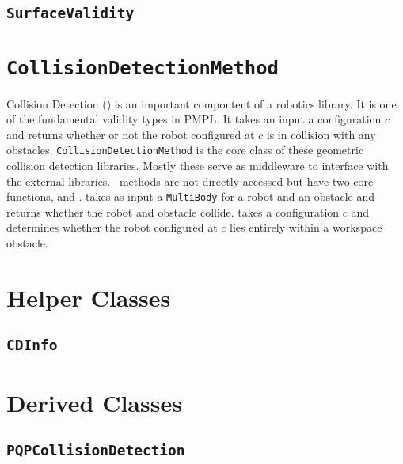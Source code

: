 \subsection{\texttt{SurfaceValidity}}

\section{\texttt{CollisionDetectionMethod}}

Collision Detection (\cd) is an important compontent of a robotics library. It
is one of the fundamental validity types in PMPL. It takes an input a
configuration $c$ and returns whether or not the robot configured at $c$ is in
collision with any obstacles. \texttt{CollisionDetectionMethod} is the core
class of these geometric collision detection libraries. Mostly these serve as
middleware to interface with the external libraries. \cd\ methods are not
directly accessed but have two core functions,  and
.  takes as input a
\texttt{MultiBody} for a robot and an obstacle and returns whether the robot and
obstacle collide.  takes a configuration $c$ and
determines whether the robot configured at $c$ lies entirely within a workspace
obstacle.

\section{Helper Classes}

\subsection{\texttt{CDInfo}}

\section{Derived Classes}

\subsection{\texttt{PQPCollisionDetection}}

